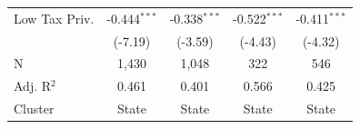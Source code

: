 \begin{tabular*}{\textwidth}{@{\extracolsep{\fill}}lcccc}
   Low Tax Priv.               & -0.444$^{***}$         & -0.338$^{***}$                & -0.522$^{***}$                & -0.411$^{***}$\\   
                               & (-7.19)               & (-3.59)                      & (-4.43)                      & (-4.32)\\   
   \hline
   N                & 1,430                  & 1,048                         & 322                           & 546\\  
   Adj. R$^2$              & 0.461                  & 0.401                         & 0.566                         & 0.425\\  
   Cluster              & State & State & State & State\\  
   \bottomrule
\end{tabular*}
\par\endgroup
